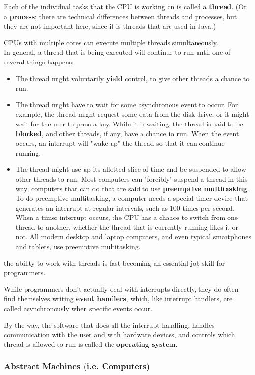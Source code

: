 \documentclass{article}
\begin{document}
Each of the individual tasks that the CPU is working on is called a \textbf{thread}. (Or a \textbf{process}; there are technical differences between threads and processes, but they are not important here, since it is threads that are used in Java.)

CPUs with multiple cores can execute multiple threads simultaneously.
\\
In general, a thread that is being executed will continue to run until one of several things happens:
\begin{itemize}
\item The thread might voluntarily \textbf{yield} control, to give other threads a chance to run.
\item The thread might have to wait for some asynchronous event to occur. For example, the thread might request some data from the disk drive, or it might wait for the user to press a key. While it is waiting, the thread is said to be \textbf{blocked}, and other threads, if any, have a chance to run. When the event occurs, an interrupt will "wake up" the thread so that it can continue running.
\item The thread might use up its allotted slice of time and be suspended to allow other threads to run. Most computers can "forcibly" suspend a thread in this way; computers that can do that are said to use \textbf{preemptive multitasking}. To do preemptive multitasking, a computer needs a special timer device that generates an interrupt at regular intervals, such as 100 times per second. When a timer interrupt occurs, the CPU has a chance to switch from one thread to another, whether the thread that is currently running likes it or not. All modern desktop and laptop computers, and even typical smartphones and tablets, use preemptive multitasking.
\end{itemize}

the ability to work with threads is fast becoming an essential job skill for programmers.

While programmers don't actually deal with interrupts directly, they do often find themselves writing \textbf{event handlers}, which, like interrupt handlers, are called asynchronously when specific events occur.

By the way, the software that does all the interrupt handling, handles communication with the user and with hardware devices, and controls which thread is allowed to run is called the \textbf{operating system}.

\subsubsection{Abstract Machines (i.e. Computers)}
\end{document}

